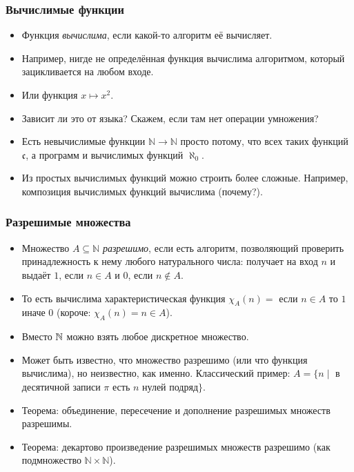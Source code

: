 \documentclass[10pt]{beamer}
\begin{document}
\begin{frame}
    \frametitle{Вычислимые функции}
    \begin{itemize}
        \item Функция \emph{вычислима}, если какой-то алгоритм её вычисляет.
        \item Например, нигде не определённая функция вычислима \pause алгоритмом, который зацикливается на любом входе.
        \pause
        \item Или функция $x \mapsto x^2$. 
        \item Зависит ли это от языка? \pause Скажем, если там нет операции умножения?
        \pause
        \item Есть невычислимые функции $\mathbb{N} \to \mathbb{N}$ \pause просто потому, что всех таких функций \pause $\mathfrak{c}$, а программ и вычислимых функций \pause $\aleph_0$.
        \item Из простых вычислимых функций можно строить более сложные. Например, композиция вычислимых функций вычислима (почему?).
    \end{itemize}
\end{frame}

\begin{frame}
    \frametitle{Разрешимые множества}
    \begin{itemize}
        \item Множество $A \subseteq \mathbb{N}$ \emph{разрешимо}, если есть алгоритм, позволяющий проверить принадлежность к нему любого натурального числа: получает на вход $n$ и выдаёт $1$, если $n \in A$ и $0$, если $n \notin A$. 
        \item То есть вычислима характеристическая функция $\chi_A(n) = $ если $n \in A$ то $1$ иначе $0$ (короче: $\chi_A(n) = n \in A$).
        \pause
        \item Вместо $\mathbb{N}$ можно взять любое дискретное множество.
        \pause
        \item Может быть известно, что множество разрешимо (или что функция вычислима), но неизвестно, как именно. Классический пример: $A = \{n \mid$ в десятичной записи $\pi$ есть $n$ нулей подряд$\}$.
        \pause
        \item Теорема: объединение, пересечение и дополнение разрешимых множеств разрешимы.
        \item Теорема: декартово произведение разрешимых множеств разрешимо (как подмножество $\mathbb{N} \times \mathbb{N}$).
    \end{itemize}
\end{frame}
\end{document}
